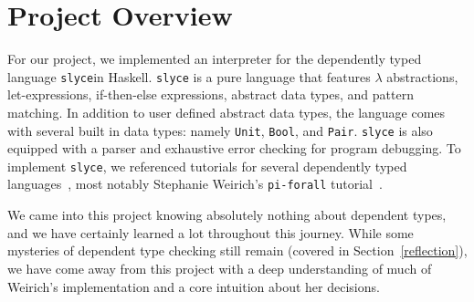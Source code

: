 \section{Project Overview}
For our project, we implemented an interpreter for the dependently typed language \texttt{slyce}\footnotemark in Haskell.
\texttt{slyce} is a pure language that features $\lambda$ abstractions, let-expressions, if-then-else expressions, abstract data types, and pattern matching.
In addition to user defined abstract data types, the language  comes with several built in data types: namely \texttt{Unit}, \texttt{Bool}, and \texttt{Pair}.
\texttt{slyce} is also equipped with a parser and exhaustive error checking for program debugging.  
To implement \texttt{slyce}, we referenced tutorials for several dependently typed languages~\cite{friedman2018little, loh2010tutorial}, most notably Stephanie Weirich's \texttt{pi-forall} tutorial~\cite{weirich2022implementing}.

We came into this project knowing absolutely nothing about dependent types, and we have certainly learned a lot throughout this journey.
While some mysteries of dependent type checking still remain (covered in Section~\ref{reflection}), we have come away from this project with a deep understanding of much of Weirich's implementation and a core intuition about her decisions.

